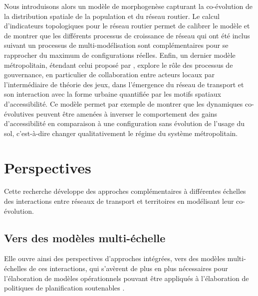\documentclass[11pt]{article}
\begin{document}
Nous introduisons alors un modèle de morphogenèse capturant la co-évolution de la distribution spatiale de la population et du réseau routier. Le calcul d'indicateurs topologiques pour le réseau routier
 permet de calibrer le modèle et de montrer que les différents processus de croissance de réseau qui ont été inclus suivant un processus de multi-modélisation sont complémentaires pour se rapprocher du maximum de configurations réelles. Enfin, un dernier modèle métropolitain, étendant celui proposé par \citep{lenechet:halshs-01272236}, explore le rôle des processus de gouvernance, en particulier de collaboration entre acteurs locaux par l'intermédiaire de théorie des jeux, dans l'émergence du réseau de transport et son interaction avec la forme urbaine quantifiée par les motifs spatiaux d'accessibilité. Ce modèle permet par exemple de montrer que les dynamiques co-évolutives peuvent être amenées à inverser le comportement des gains d'accessibilité en comparaison à une configuration sans évolution de l'usage du sol, c'est-à-dire changer qualitativement le régime du système métropolitain.


\section{Perspectives}

Cette recherche développe des approches complémentaires à différentes échelles des interactions entre réseaux de transport et territoires en modélisant leur co-évolution.

\subsection{Vers des modèles multi-échelle}


Elle ouvre ainsi des perspectives d'approches intégrées, vers des modèles multi-échelles de ces interactions, qui s'avèrent de plus en plus nécessaires pour l'élaboration de modèles opérationnels pouvant être appliqués à l'élaboration de politiques de planification soutenables \citep{rozenblat2018conclusion}.










\end{document}
